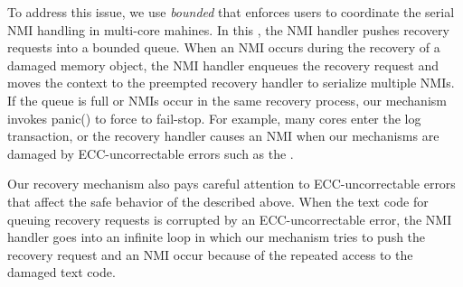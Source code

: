 To address this issue, we use \emph{bounded {\nmiq}} that enforces users to coordinate the serial NMI handling in multi-core mahines. In this {\nmiq}, the NMI handler pushes recovery requests into a bounded queue. When an NMI occurs during the recovery of a damaged memory object, the NMI handler enqueues the recovery request and moves the context to the preempted recovery handler to serialize multiple NMIs.
If the queue is full or NMIs occur in the same recovery process, our mechanism invokes \textsf{panic()} to force {\sysname} to fail-stop. For example, many cores enter the log transaction, or the recovery handler causes an NMI when our mechanisms are damaged by ECC-uncorrectable errors such as the {\alist}.

Our recovery mechanism also pays careful attention to ECC-uncorrectable errors that affect the safe behavior of the {\nmiq} described above. When the text code for queuing recovery requests is corrupted by an ECC-uncorrectable error, the NMI handler goes into an infinite loop in which our mechanism tries to push the recovery request and an NMI occur because of the repeated access to the damaged text code.

